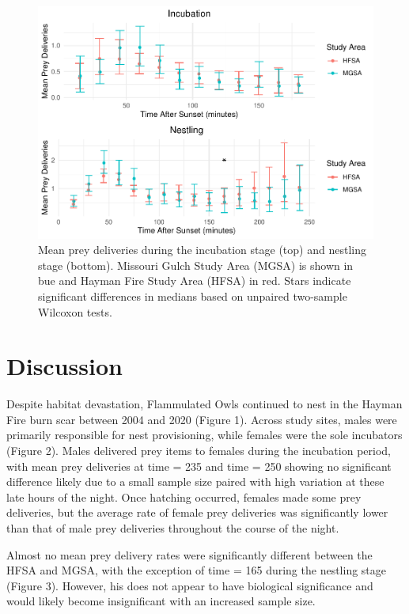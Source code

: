 \documentclass[]{article}
\begin{document}
\begin{figure}
\centering
\includegraphics{../manuscript/figures/plot_site-1.pdf}
\caption{Mean prey deliveries during the incubation stage (top) and
nestling stage (bottom). Missouri Gulch Study Area (MGSA) is shown in
bue and Hayman Fire Study Area (HFSA) in red. Stars indicate significant
differences in medians based on unpaired two-sample Wilcoxon tests.}
\end{figure}

\hypertarget{discussion}{%
\section{Discussion}\label{discussion}}

Despite habitat devastation, Flammulated Owls continued to nest in the
Hayman Fire burn scar between 2004 and 2020 (Figure 1). Across study
sites, males were primarily responsible for nest provisioning, while
females were the sole incubators (Figure 2). Males delivered prey items
to females during the incubation period, with mean prey deliveries at
time = 235 and time = 250 showing no significant difference likely due
to a small sample size paired with high variation at these late hours of
the night. Once hatching occurred, females made some prey deliveries,
but the average rate of female prey deliveries was significantly lower
than that of male prey deliveries throughout the course of the night.

Almost no mean prey delivery rates were significantly different between
the HFSA and MGSA, with the exception of time = 165 during the nestling
stage (Figure 3). However, his does not appear to have biological
significance and would likely become insignificant with an increased
sample size.
\end{document}
